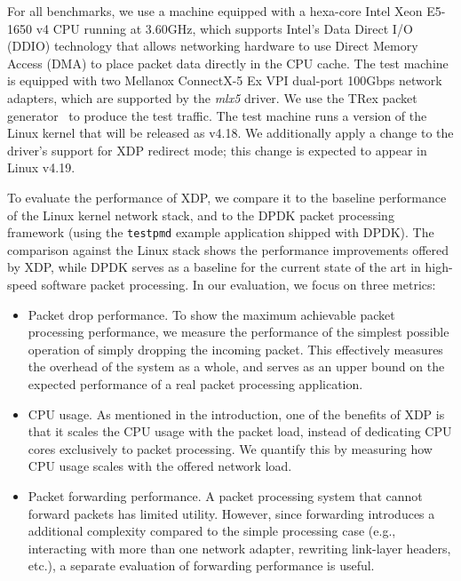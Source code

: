 \documentclass[10pt,sigconf,anonymous]{acmart}
\begin{document}
For all benchmarks, we use a machine equipped with a hexa-core Intel Xeon
E5-1650 v4 CPU running at 3.60GHz, which supports Intel's Data Direct I/O (DDIO)
technology that allows networking hardware to use Direct Memory Access (DMA) to
place packet data directly in the CPU cache. The test machine is equipped with
two Mellanox ConnectX-5 Ex VPI dual-port 100Gbps network adapters, which are
supported by the \emph{mlx5} driver. We use the TRex packet
generator~\cite{cisco18:_trex_traff_gener} to produce the test traffic. The test
machine runs a version of the Linux kernel that will be released as v4.18. We
additionally apply a change to the driver's support for XDP redirect mode; this
change is expected to appear in Linux v4.19.


To evaluate the performance of XDP, we compare it to the baseline performance of
the Linux kernel network stack, and to the DPDK packet processing framework
(using the \texttt{testpmd} example application shipped with DPDK). The
comparison against the Linux stack shows the performance improvements offered by
XDP, while DPDK serves as a baseline for the current state of the art in
high-speed software packet processing. In our evaluation, we focus on three
metrics:

\begin{itemize}
\item Packet drop performance. To show the maximum achievable packet processing
  performance, we measure the performance of the simplest possible operation of
  simply dropping the incoming packet. This effectively measures the overhead of
  the system as a whole, and serves as an upper bound on the expected
  performance of a real packet processing application.

\item CPU usage. As mentioned in the introduction, one of the benefits of XDP is
  that it scales the CPU usage with the packet load, instead of dedicating CPU
  cores exclusively to packet processing. We quantify this by measuring how CPU
  usage scales with the offered network load.

\item Packet forwarding performance. A packet processing system that cannot
  forward packets has limited utility. However, since forwarding introduces a
  additional complexity compared to the simple processing case (e.g.,
  interacting with more than one network adapter, rewriting link-layer headers,
  etc.), a separate evaluation of forwarding performance is useful.
\end{itemize}
\end{document}
